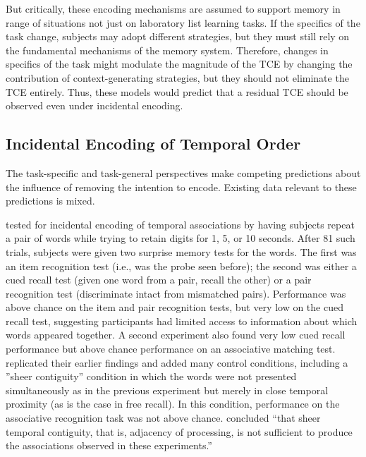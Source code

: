 \documentclass[man,natbib,floatsintext]{apa6} %
\begin{document}
But critically, these encoding mechanisms are assumed to support memory in range of situations not just on laboratory list learning tasks. If the specifics of the task change, subjects may adopt different strategies, but they must still rely on the fundamental mechanisms of the memory system. Therefore, changes in specifics of the task might modulate the magnitude of the TCE by changing the contribution of context-generating strategies, but they should not eliminate the TCE entirely. Thus, these models would predict that a residual TCE should be observed even under incidental encoding. 

\subsection{Incidental Encoding of Temporal Order}
The task-specific and task-general perspectives make competing predictions about the influence of removing the intention to encode. Existing data relevant to these predictions is mixed. 

\citet{GlenBrad79} tested for incidental encoding of temporal associations by having subjects repeat a pair of words while trying to retain digits for 1, 5, or 10 seconds. After 81 such trials, subjects were given two surprise memory tests for the words. The first was an item recognition test (i.e., was the probe seen before); the second was either a cued recall test (given one word from a pair, recall the other) or a pair recognition test (discriminate intact from mismatched pairs). Performance was above chance on the item and pair recognition tests, but very low on the cued recall test, suggesting participants had limited access to information about which words appeared together. A second experiment also found very low cued recall performance but above chance performance on an associative matching test. \citet{BradGlen83} replicated their earlier findings and added many control conditions, including a ''sheer contiguity'' condition in which the words were not presented simultaneously as in the previous experiment but merely in close temporal proximity (as is the case in free recall). In this condition, performance on the associative recognition task was not above chance. \citet[][p. 665]{BradGlen83} concluded ``that sheer temporal contiguity, that is, adjacency of processing, is not sufficient to produce the associations observed in these experiments.'' 
\end{document}
